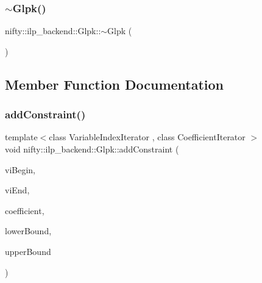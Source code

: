 \mbox{\label{classnifty_1_1ilp__backend_1_1Glpk_a9696f83fd9a1688bcdf5a05b84c03976}} 
\subsubsection{\texorpdfstring{$\sim$\+Glpk()}{~Glpk()}}
{\footnotesize\ttfamily nifty\+::ilp\+\_\+backend\+::\+Glpk\+::$\sim$\+Glpk (\begin{DoxyParamCaption}{ }\end{DoxyParamCaption})\hspace{0.3cm}{\ttfamily [inline]}}



\subsection{Member Function Documentation}
\mbox{\label{classnifty_1_1ilp__backend_1_1Glpk_a756aac8075dfd7957e0b90e27f1b141d}} 
\subsubsection{\texorpdfstring{add\+Constraint()}{addConstraint()}}
{\footnotesize\ttfamily template$<$class Variable\+Index\+Iterator , class Coefficient\+Iterator $>$ \\
void nifty\+::ilp\+\_\+backend\+::\+Glpk\+::add\+Constraint (\begin{DoxyParamCaption}\item[{Variable\+Index\+Iterator}]{vi\+Begin,  }\item[{Variable\+Index\+Iterator}]{vi\+End,  }\item[{Coefficient\+Iterator}]{coefficient,  }\item[{const double}]{lower\+Bound,  }\item[{const double}]{upper\+Bound }\end{DoxyParamCaption})\hspace{0.3cm}{\ttfamily [inline]}}

